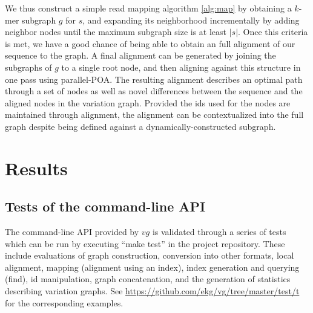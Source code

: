 \documentclass{article}
\begin{document}
We thus construct a simple read mapping algorithm \ref{alg:map} by obtaining a $k$-mer subgraph $g$ for $s$, and expanding its neighborhood incrementally by adding neighbor nodes until the maximum subgraph size is at least $|s|$. Once this criteria is met, we have a good chance of being able to obtain an full alignment of our sequence to the graph. A final alignment can be generated by joining the subgraphs of $g$ to a single root node, and then aligning against this structure in one pass using parallel-POA. The resulting alignment describes an optimal path through a set of nodes as well as novel differences between the sequence and the aligned nodes in the variation graph. Provided the ids used for the nodes are maintained through alignment, the alignment can be contextualized into the full graph despite being defined against a dynamically-constructed subgraph.


\section{Results}

\subsection{Tests of the command-line API}

The command-line API provided by $vg$ is validated through a series of tests which can be run by executing ``make test'' in the project repository. These include evaluations of graph construction, conversion into other formats, local alignment, mapping (alignment using an index), index generation and querying (find), id manipulation, graph concatenation, and the generation of statistics describing variation graphs. See \url{https://github.com/ekg/vg/tree/master/test/t} for the corresponding examples.
\end{document}
